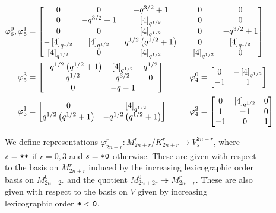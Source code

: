 \documentclass{amsart}
\begin{document}
\begin{figure}
\iffalse
\def\tho{\Phi_3(q^{1/2})}
\def\tht{\brk{3}_{q^{1/2}}}
\def\to{q^{1/2}\brk{2}_{q^{1/2}}}
Define the following coefficients:
\begin{align*}
  \tho &:= q^{3/2} + 1\\
  \tht &:= q^{3/2} + q + q^{1/2} + 1\\
  \to &:= q + q^{1/2}
\end{align*}
\fi

\def\tho{q^{3/2} + 1}
\def\tht{\brk{4}_{q^{1/2}}}
\def\to{q^{1/2}\prn{q^{1/2} + 1}}
\begin{align*}
  \varphi_6^0, \varphi_5^1 &= \begin{bmatrix}
    0 & 0 & -\tho & 0 & 0\\
    0 & -\tho & \tht & 0 & 0\\
    0 & 0 & \tht & 0 & -\tho\\
    -\tht & \tht & \to & 0 & \tht\\
    \tht & 0 & \tht & -\tht & 0
  \end{bmatrix}\\
  \varphi_5^3 &= \begin{bmatrix}
    -\to & \tht & q^{1/2}\\
    q^{1/2} & q^{3/2} & 0\\
    0 & -q - 1
  \end{bmatrix}  \hspace{30pt} 
  \varphi_4^0 = \begin{bmatrix}
    0 & -\tht\\
    -1 & 1
  \end{bmatrix}\\
  \varphi_3^1 &= \begin{bmatrix}
    0 & -\tht\\
    \to & -\to
  \end{bmatrix} \hspace{27pt}
  \varphi_4^2 = \begin{bmatrix}
    0 & \tht & 0\\
    1 & -1 & 0\\
    -1 & 0 & 1
  \end{bmatrix}
\end{align*}
\caption{We define representations $\varphi_{2n + r}^r:M_{2n + r}^r/K_{2n + r}^r \rightarrow V^{2n + r}_{s}$, where $s = \texttt{*}\texttt{*}$ if $r = 0,3$ and $s = \texttt{*}\texttt{0}$ otherwise.
These are given with respect to the basis on $M_{2n + r}^r$ induced by the increasing lexicographic order basis on $M_{2n + 2r}^0$ and the quotient $M_{2n + 2r}^0 \twoheadrightarrow M_{2n + r}^r$.
These are also given with respect to the basis on $V$ given by increasing lexicographic order $\texttt{*} < \texttt{0}$.
  }\label{Fib Data}
\end{figure}
\end{document}
